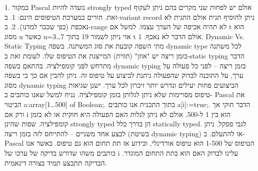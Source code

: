 \begin{טבלא}[!htbp]
      1. במקור Pascal נועדה להיות strongly typed אולם יש לפחות שני מקרים בהם ניתן לעקוף זאת. חורים במערכת הטיפוסים הינם:
      1. ב-variant record ניתן להוסיף תגית אולם התגית לא נאכפת (כפי שכבר למדנו).
      2. ב-range לא תהיה אכיפה של הערך עצמו. למשל אם t הוא מסוג u כאשר u=3…7 אזי ניתן לשמור 19 בתוך t אולם הדבר לא נאכף.
      1. Dynamic Vs. Static Typing מתי השפה קובעת את סוג המשתנה. בשפה dynamic type לכל משתנה בזמן ריצה יש "אוזן" (תווית) המייצגת את הטיפוס שלו.
      לעומת זאת ב-static typing הדבר מתרחש לפני קומפילציה.
      בהתאם בשפה dynamic typing בזמן ריצה – לפני כל פעולה על ערך, על התוכנה לבדוק שהפעולה ניתנת לביצוע על טיפוס זה.
      ניתן להבין אם כך כי בשפה מסוג dynamic typing הביצועים פחות יעילים ונדרש יותר זיכרון לכל ערך.
      ישנן שגיאות טיפוס מסויימות שלא ניתן לגלותן בזמן קומפילציה. נניח למשל שאנו
      כותבים ב- Pascal את הביטוי a:array[1…500] of Boolean;. בתוך התכנית אנו כותבים
      a[i]:=true;. הדבר חוקי אך ורק אם i הוא בין 1 ל-500. אולם לא ניתן לגלות האם
      הפעולה היא חוקית או לא בזמן קומפילציה. שפות שהינן strongly typed הן בדרך כלל
      statically typed. לגבי פסקל, ניתן לבצע אחד משניים – להתייחס לזה בזמן ריצה
      (בשיטת dynamic typing) או להתעלם. ב- Pascal הטיפוס של 1-500 הוא טיפוס אורדינלי,
      וכידוע אז תת תחום הוא גם טיפוס. כאשר אנו כותבים משהו שדורש בדיקה של ערכו של i
      עלינו לבדוק האם הוא בתת התחום המוגדר. הבדיקה תתבצע תמיד בצורה דינאמית.


\end{טבלא}
